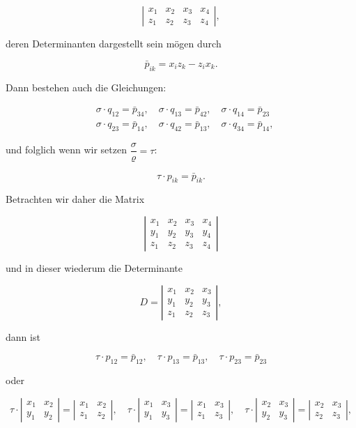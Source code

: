 \documentclass[11pt]{article}
\providecommand{\weq}[2]{\begin{equation}\tag{#1}#2\end{equation}}
\begin{document}
\weq{3}{\left| \begin{array}{cccc} x_1 & x_2 & x_3 & x_4 \\ z_1 & z_2 & z_3 & z_4 \end{array} \right|,}

deren Determinanten dargestellt sein mögen durch

\[ \bar p_{ik} = x_iz_k - z_ix_k. \]

Dann bestehen auch die Gleichungen:

\[ \begin{aligned}
&\sigma\cdot q_{12}=\bar p_{34},\quad \sigma\cdot q_{13}=\bar p_{42},\quad \sigma\cdot q_{14}=\bar p_{23}\\
&\sigma\cdot q_{23}=\bar p_{14},\quad \sigma\cdot q_{42}=\bar p_{13},\quad \sigma\cdot q_{34}=\bar p_{14},
\end{aligned} \]

und folglich wenn wir setzen $\dfrac{\sigma}{\varrho}=\tau$:

\[ \tau\cdot p_{ik} = \bar p_{ik}. \]

Betrachten wir daher die Matrix

\weq{4}{\left| \begin{array}{cccc} x_1 & x_2 & x_3 & x_4 \\ y_1 & y_2 & y_3 & y_4 \\ z_1 & z_2 & z_3 & z_4 \end{array} \right|}

und in dieser wiederum die Determinante

\[ D = \left| \begin{array}{ccc} x_1 & x_2 & x_3 \\ y_1 & y_2 & y_3 \\ z_1 & z_2 & z_3 \end{array} \right|, \]

dann ist

\[ \tau\cdot p_{12}=\bar p_{12},\quad \tau\cdot p_{13}=\bar p_{13},\quad \tau\cdot p_{23}=\bar p_{23} \]

oder

\[ \tau\cdot \left|\begin{array}{cc} x_1&x_2\\ y_1&y_2\end{array}\right| = \left|\begin{array}{cc} x_1&x_2\\ z_1&z_2\end{array}\right|,\quad
\tau\cdot \left|\begin{array}{cc} x_1&x_3\\ y_1&y_3\end{array}\right| = \left|\begin{array}{cc} x_1&x_3\\ z_1&z_3\end{array}\right|,\quad
\tau\cdot \left|\begin{array}{cc} x_2&x_3\\ y_2&y_3\end{array}\right| = \left|\begin{array}{cc} x_2&x_3\\ z_2&z_3\end{array}\right|, \]
\end{document}
